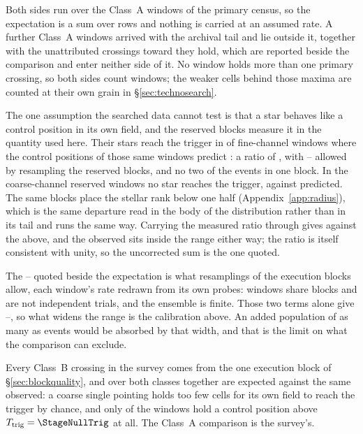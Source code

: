 Both sides run over the \CeNWin{} Class~A windows of the primary census, so
the expectation is a sum over rows and nothing is carried at an assumed rate.
A further \CeNWinTail{} Class~A windows arrived with the archival tail and lie
outside it, together with the \CeNTailCrossWord{} unattributed crossings
toward \CeTailStar{} they hold, which are reported beside the comparison and
enter neither side of it. No window holds more than one primary crossing, so
both sides count windows; the weaker cells behind those maxima are counted at
their own grain in \S\ref{sec:technosearch}.

The one assumption the searched data cannot test is that a star behaves like
a control position in its own field, and the reserved blocks measure it in
the quantity used here. Their stars reach the trigger in \StHoObs{} of
\StHoNFine{} fine-channel windows where the control positions of those same
windows predict \StHoExpFine: a ratio of \StHoRatio, with \StHoLo--\StHoHi{}
allowed by resampling the reserved blocks, and no two of the events in one
block. In the \StHoNCoarse{} coarse-channel reserved windows no star reaches
the trigger, against \StHoExpCoarse{} predicted. The same blocks place the
stellar rank below one half (Appendix~\ref{app:radius}), which is the same
departure read in the body of the distribution rather than in its tail and
runs the same way. Carrying the measured ratio through gives \CeExpX{}
against the \CeExp{} above, and the observed \CeObs{} sits inside the range
either way; the ratio is itself consistent with unity, so the uncorrected sum
is the one quoted.

The \CeLo--\CeHi{} quoted beside the expectation is what \CeNBoot{}
resamplings of the execution blocks allow, each window's rate redrawn from
its own \NCtrl{} probes: windows share blocks and are not independent
trials, and the ensemble is finite. Those two terms alone give
\CeLoNull--\CeHiNull, so what widens the range is the calibration above. An
added population of as many as \CeAddBlind{} events would be absorbed by that
width, and that is the limit on what the comparison can exclude.

Every Class~B crossing in the survey comes from the one execution block of
\S\ref{sec:blockquality}, and over both classes together \CeExpSurv{} are
expected against the same \CeObs{} observed: a coarse single pointing holds
too few cells for its own field to reach the trigger by chance, and only
\NCtrlWinObs{} of the \NWindows{} windows hold a control position above
$T_{\rm trig}=\StageNullTrig$ at all. The Class~A comparison is the survey's.

